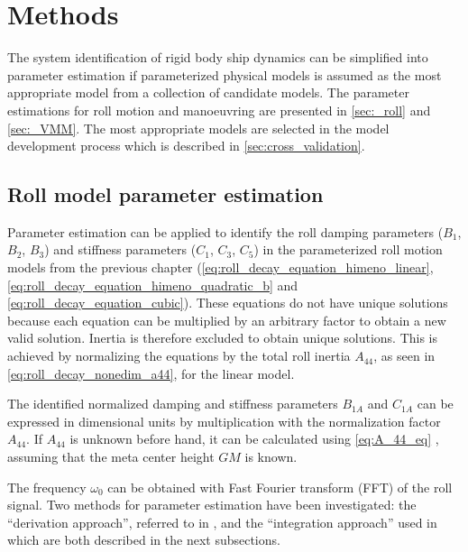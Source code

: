 \chapter{Methods\label{ch:methods}}
The system identification of rigid body ship dynamics can be simplified into parameter estimation if parameterized physical models is assumed as the most appropriate model from a collection of candidate models.
The parameter estimations for roll motion and manoeuvring are presented in \autoref{sec:_roll} and \autoref{sec:_VMM}. The most appropriate models are selected in the model development process which is described in \autoref{sec:cross_validation}.

\section{Roll model parameter estimation} \label{sec:_roll}
\noindent Parameter estimation can be applied to identify the roll damping parameters ($B_1$, $B_2$, $B_3$) and stiffness parameters ($C_1$, $C_3$, $C_5$) in the parameterized roll motion models from the previous chapter (\autoref{eq:roll_decay_equation_himeno_linear}, \autoref{eq:roll_decay_equation_himeno_quadratic_b} and \autoref{eq:roll_decay_equation_cubic}). These equations do not have unique solutions because each equation can be multiplied by an arbitrary factor to obtain a new valid solution. Inertia is therefore excluded to obtain unique solutions. This is achieved by normalizing the equations by the total roll inertia $A_{44}$, as seen in \autoref{eq:roll_decay_nonedim_a44}, for the linear model.



\noindent The identified normalized damping and stiffness parameters $B_{1A}$ and $C_{1A}$ can be expressed in dimensional units by multiplication with the normalization factor $A_{44}$. If $A_{44}$ is unknown before hand, it can be calculated using \autoref{eq:A_44_eq} \cite{piehl_ship_2016}, assuming that the meta center height $GM$ is known.


\noindent The frequency $\omega_0$ can be obtained with Fast Fourier transform (FFT) of the roll signal. 
Two methods for parameter estimation have been investigated: the ``derivation approach'', referred to in \textcite{imo_1200_2006}, and the ``integration approach'' used in \textcite{soder_assessment_2019} which are both described in the next subsections. 

